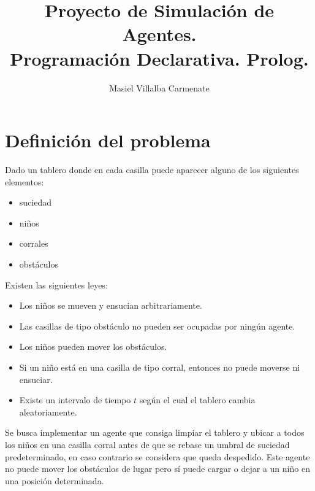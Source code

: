 \documentclass{llncs}
\begin{document}
\title{Proyecto de Simulaci\'on de Agentes.\\ Programaci\'on Declarativa. Prolog.}

\author{
  Masiel Villalba Carmenate 
  }



\maketitle

\section{Definici\'on del problema}

Dado un tablero donde en cada casilla puede aparecer alguno de los siguientes elementos:

\begin{itemize}
\item suciedad
\item ni\~nos
\item corrales
\item obst\'aculos
\end{itemize}

Existen las siguientes leyes:

\begin{itemize}
\item Los ni\~nos se mueven y ensucian arbitrariamente.
\item Las casillas de tipo obst\'aculo no pueden ser ocupadas por ning\'un agente.
\item Los ni\~nos pueden mover los obst\'aculos.
\item Si un ni\~no est\'a en una casilla de tipo corral, entonces no puede moverse ni ensuciar.
\item Existe un intervalo de tiempo $t$ seg\'un el cual el tablero cambia aleatoriamente.
\end{itemize}


Se busca implementar un agente que consiga limpiar el tablero y ubicar a todos los ni\~nos en una casilla corral antes de que se rebase un umbral de suciedad predeterminado, en caso contrario se considera que queda despedido. Este agente no puede mover los obst\'aculos de lugar pero s\'i puede cargar o dejar a un ni\~no en una posici\'on determinada.
\end{document}
